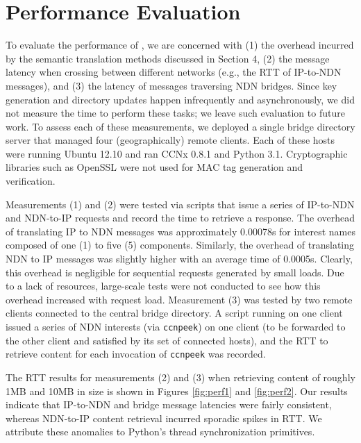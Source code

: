 \section{Performance Evaluation}
To evaluate the performance of \sink, we are concerned with (1) the overhead incurred by the semantic translation methods discussed in Section 4, (2) the message latency when crossing between different networks (e.g., the RTT of IP-to-NDN messages), and (3) the latency of messages traversing NDN bridges. Since key generation and directory updates happen infrequently and asynchronously, we did not measure the time to perform these tasks; we leave such evaluation to future work. To assess each of these measurements, we deployed a single bridge directory server that managed four (geographically) remote clients. Each of these hosts were running Ubuntu 12.10 and ran CCNx 0.8.1 and Python 3.1. Cryptographic libraries such as OpenSSL were not used for MAC tag generation and verification. 

Measurements (1) and (2) were tested via scripts that issue a series of IP-to-NDN and NDN-to-IP requests and record the time to retrieve a response. The overhead of translating IP to NDN messages was approximately 0.00078s for interest names composed of one (1) to five (5) components. Similarly, the overhead of translating NDN to IP messages was slightly higher with an average time of 0.0005s. Clearly, this overhead is negligible for sequential requests generated by small loads. Due to a lack of resources, large-scale tests were not conducted to see how this overhead increased with request load. Measurement (3) was tested by two remote clients connected to the central bridge directory. A script running on one client issued a series of NDN interests (via {\tt ccnpeek}) on one client (to be forwarded to the other client and satisfied by its set of connected hosts), and the RTT to retrieve content for each invocation of {\tt ccnpeek} was recorded. 

The RTT results for measurements (2) and (3) when retrieving content of roughly 1MB and 10MB in size is shown in Figures \ref{fig:perf1} and \ref{fig:perf2}. Our results indicate that IP-to-NDN and bridge message latencies were fairly consistent, whereas NDN-to-IP content retrieval incurred sporadic spikes in RTT. We attribute these anomalies to Python's thread synchronization primitives. 

